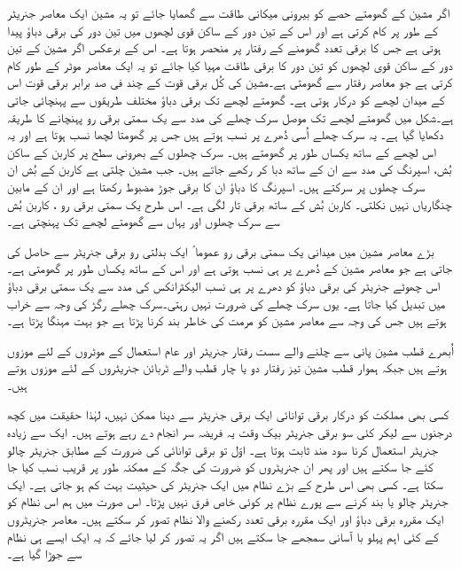 اگر مشین کے گھومتے حصے کو بیرونی میکانی طاقت سے گھمایا جائے تو یہ مشین ایک معاصر جنریٹر کے طور پر کام کرتی ہے اور اس کے تین دور کے ساکن قوی لچھوں میں تین دور کی برقی دباؤ پیدا ہوتی ہے جس کا برقی تعدد گھومنے کے رفتار پر منحصر ہوتا ہے۔ اس کے برعکس اگر مشین کے تین دور کے ساکن قوی لچھوں کو تین دور کا برقی طاقت مہیا کیا جائے تو یہ ایک معاصر موٹر کے طور کام کرتی ہے جو معاصر رفتار سے گھومتی ہے۔مشین کی کُل برقی قوت کے چند فی صد  برابر برقی قوت اس کے میدان لچھے کو درکار ہوتی ہے۔ گھومتے لچھے تک برقی دباؤ مختلف طریقوں سے پہنچائی جاتی ہے۔شکل  میں گھومتے لچھے تک موصل سرک چھلے  کی مدد سے یک سمتی برقی رو پہنچانے کا طریقہ دکھایا گیا ہے۔ یہ سرک چھلے اُسی دُھرے  پر نسب ہوتے ہیں جس پر گھومتا لچھا نسب ہوتا ہے اور یہ اس لچھے کے ساتھ یکساں طور پر گھومتے ہیں۔ سرک چھلوں  کے بھرونی سطح پر کاربن کے ساکن بُش، اسپرنگ  کی مدد سے ان کے ساتھ دبا کر رکھے جاتے ہیں۔ جب مشین چلتی ہے  کاربن کے بُش ان سرک چھلوں پر سرکتے ہیں۔ اسپرنگ کا دباؤ ان کا برقی جوڑ مضبوط رکھتا ہے اور ان کے مابین چنگاریاں نہیں نکلتی۔ کاربن بُش کے ساتھ برقی تار لگی ہے۔ اس طرح یک سمتی برقی رو  ، کاربن بُش سے سرک چھلوں اور یہاں سے گھومتے لچھے تک پہنچتی ہے۔

بڑے معاصر مشین میں میدانی یک سمتی برقی رو عموما ً ایک بدلتی رو برقی جنریٹر سے حاصل کی جاتی ہے جو معاصر مشین کے دُھرے پر ہی نسب ہوتی ہے اور اس کے ساتھ یکساں طور پر گھومتی ہے۔اس چھوٹے جنریٹر کی برقی دباؤ کو دھرے پر ہی نسب الیکٹرانکس کی مدد سے یک سمتی برقی دباؤ میں تبدیل کیا جاتا ہے۔ یوں سرک چھلے کی ضرورت نہیں رہتی۔سرک چھلے رگڑ کی وجہ سے خراب ہوتے ہیں جس کی وجہ سے معاصر مشین کو مرمت کی خاطر بند کرنا پڑتا ہے جو بہت مہنگا پڑتا ہے۔

اُبھرے قطب مشین پانی سے چلنے والے سست رفتار جنریٹر اور  عام استعمال کے موٹروں کے لئے موزوں ہوتے ہیں جبکہ ہموار قطب مشین تیز رفتار دو یا چار قطب والے ٹربائن جنریٹروں کے لئے موزوں ہوتے ہیں۔

کسی بھی مملکت کو درکار برقی توانائی ایک برقی جنریٹر سے دینا ممکن نہیں، لہٰذا حقیقت میں کچھ درجنوں سے لیکر کئی سو برقی جنریٹر بیک وقت یہ فریضہ سر انجام دے رہے ہوتے ہیں۔ ایک سے زیادہ جنریٹر استعمال کرنا سود مند ثابت ہوتا ہے۔ اوّل تو برقی توانائی کی ضرورت کے مطابق جنریٹر چالو کئے جا سکتے ہیں اور پھر ان جنریٹروں کو ضرورت کی جگہ کے ممکنہ طور پر قریب نسب کیا جا سکتا ہے۔ کسی بھی اس طرح کے بڑے نظام میں ایک جنریٹر کی حیثیت بہت کم ہو جاتی ہے۔ ایک جنریٹر چالو یا بند کرنے سے پورے نظام پر کوئی خاص فرق نہیں پڑتا۔ اس صورت میں ہم اس نظام کو ایک مقررہ برقی دباؤ اور ایک مقررہ برقی تعدد رکھنے والا نظام تصور کر سکتے ہیں۔ معاصر جنریٹروں کے کئی اہم پہلو با آسانی سمجھے جا سکتے ہیں اگر یہ تصور کر لیا جائے کہ یہ ایک ایسے ہی نظام سے جوڑا گیا ہے۔

